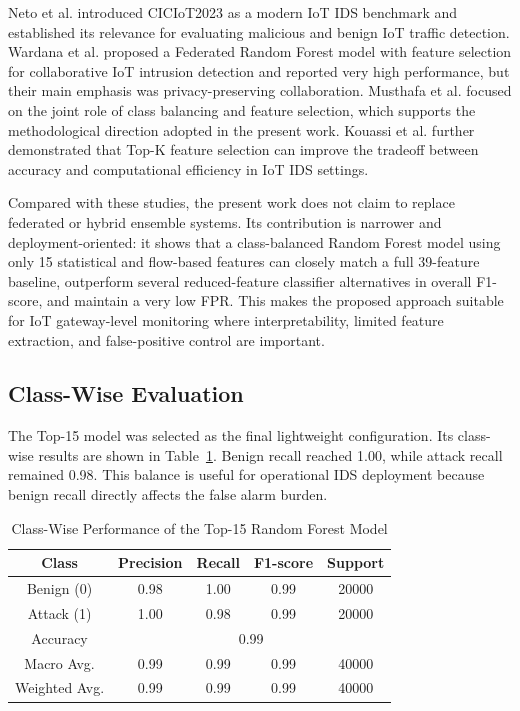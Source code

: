 \documentclass[journal]{IEEEtran}
\begin{document}
Neto et al. introduced CICIoT2023 as a modern IoT IDS benchmark and established its relevance for evaluating malicious and benign IoT traffic detection. Wardana et al. proposed a Federated Random Forest model with feature selection for collaborative IoT intrusion detection and reported very high performance, but their main emphasis was privacy-preserving collaboration. Musthafa et al. focused on the joint role of class balancing and feature selection, which supports the methodological direction adopted in the present work. Kouassi et al. further demonstrated that Top-K feature selection can improve the tradeoff between accuracy and computational efficiency in IoT IDS settings.

Compared with these studies, the present work does not claim to replace federated or hybrid ensemble systems. Its contribution is narrower and deployment-oriented: it shows that a class-balanced Random Forest model using only 15 statistical and flow-based features can closely match a full 39-feature baseline, outperform several reduced-feature classifier alternatives in overall F1-score, and maintain a very low FPR. This makes the proposed approach suitable for IoT gateway-level monitoring where interpretability, limited feature extraction, and false-positive control are important.

\subsection{Class-Wise Evaluation}

The Top-15 model was selected as the final lightweight configuration. Its class-wise results are shown in Table~\ref{tab:classwise_top15}. Benign recall reached 1.00, while attack recall remained 0.98. This balance is useful for operational IDS deployment because benign recall directly affects the false alarm burden.

\begin{table}[htbp]
\caption{Class-Wise Performance of the Top-15 Random Forest Model}
\label{tab:classwise_top15}
\centering
\begin{tabular}{|c|c|c|c|c|}
\hline
\textbf{Class} & \textbf{Precision} & \textbf{Recall} & \textbf{F1-score} & \textbf{Support} \\
\hline
Benign (0) & 0.98 & 1.00 & 0.99 & 20000 \\
Attack (1) & 1.00 & 0.98 & 0.99 & 20000 \\
\hline
Accuracy & \multicolumn{4}{c|}{0.99} \\
Macro Avg. & 0.99 & 0.99 & 0.99 & 40000 \\
Weighted Avg. & 0.99 & 0.99 & 0.99 & 40000 \\
\hline
\end{tabular}
\end{table}
\end{document}
